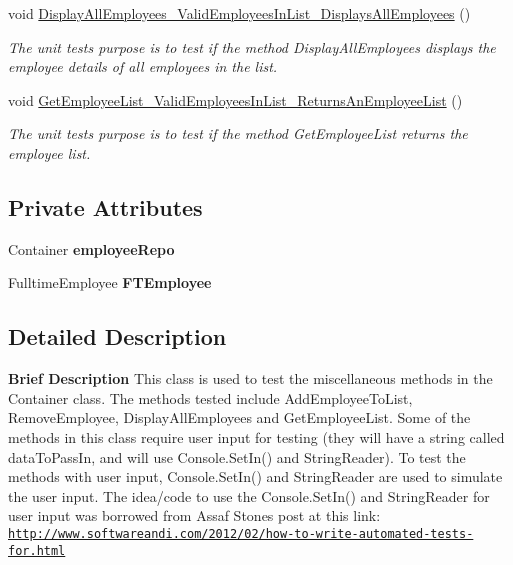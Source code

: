 \begin{DoxyCompactItemize}
void \hyperlink{class_the_company_1_1_tests_1_1_other_tests_a4173aa7634a92048d0afda36c89f7e55}{Display\+All\+Employees\+\_\+\+Valid\+Employees\+In\+List\+\_\+\+Displays\+All\+Employees} ()
\begin{DoxyCompactList}\small\item\em The unit test\textquotesingle{}s purpose is to test if the method Display\+All\+Employees displays the employee details of all employees in the list. \end{DoxyCompactList}\item 
void \hyperlink{class_the_company_1_1_tests_1_1_other_tests_a3809d7035a2570bae67b7b9610f5c96f}{Get\+Employee\+List\+\_\+\+Valid\+Employees\+In\+List\+\_\+\+Returns\+An\+Employee\+List} ()
\begin{DoxyCompactList}\small\item\em The unit test\textquotesingle{}s purpose is to test if the method Get\+Employee\+List returns the employee list. \end{DoxyCompactList}\end{DoxyCompactItemize}
\subsection*{Private Attributes}
\begin{DoxyCompactItemize}
\item 
\hypertarget{class_the_company_1_1_tests_1_1_other_tests_a76b4c4cdea3948df680a9cafbd75ebd0}{}Container {\bfseries employee\+Repo}\label{class_the_company_1_1_tests_1_1_other_tests_a76b4c4cdea3948df680a9cafbd75ebd0}

\item 
\hypertarget{class_the_company_1_1_tests_1_1_other_tests_a1b44fe8f452b8c4116dbcde629dc0d65}{}Fulltime\+Employee {\bfseries F\+T\+Employee}\label{class_the_company_1_1_tests_1_1_other_tests_a1b44fe8f452b8c4116dbcde629dc0d65}

\end{DoxyCompactItemize}


\subsection{Detailed Description}
{\bfseries  Brief Description} This class is used to test the miscellaneous methods in the Container class. The methods tested include Add\+Employee\+To\+List, Remove\+Employee, Display\+All\+Employees and Get\+Employee\+List. Some of the methods in this class require user input for testing (they will have a string called data\+To\+Pass\+In, and will use Console.\+Set\+In() and String\+Reader). To test the methods with user input, Console.\+Set\+In() and String\+Reader are used to simulate the user input. The idea/code to use the Console.\+Set\+In() and String\+Reader for user input was borrowed from Assaf Stone\textquotesingle{}s post at this link\+: \href{http://www.softwareandi.com/2012/02/how-to-write-automated-tests-for.html}{\tt http\+://www.\+softwareandi.\+com/2012/02/how-\/to-\/write-\/automated-\/tests-\/for.\+html} 

